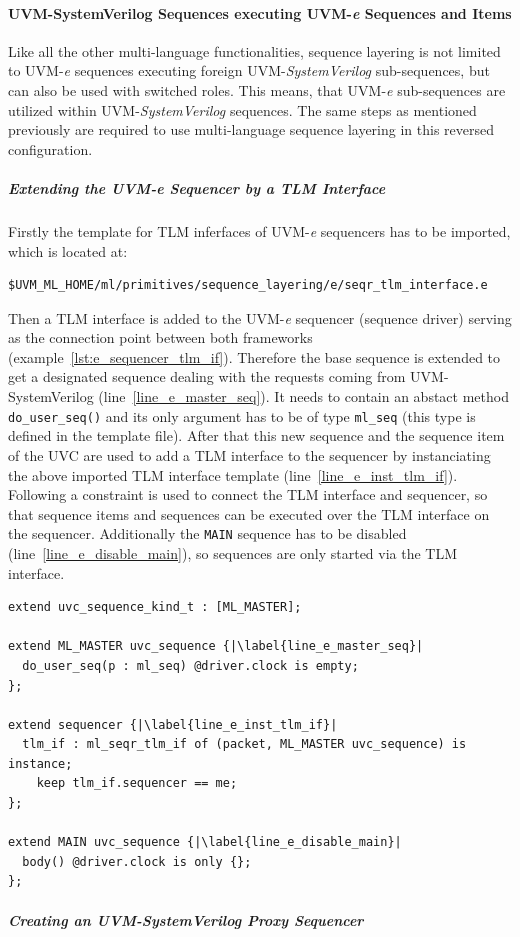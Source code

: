 \paragraph{UVM-SystemVerilog Sequences executing UVM-\textit{e} Sequences and Items}
Like all the other multi-language functionalities, sequence layering is not limited to UVM-\textit{e} sequences executing foreign UVM-\emph{SystemVerilog} sub-sequences, but can also be used with switched roles. This means, that UVM-\textit{e} sub-sequences are utilized within UVM-\emph{SystemVerilog} sequences. The same steps as mentioned previously are required to use multi-language sequence layering in this reversed configuration. 
\subparagraph{Extending the UVM-\textit{e} Sequencer by a TLM Interface}
Firstly the template for TLM inferfaces of UVM-\textit{e} sequencers has to be imported, which is located at:
\smallskip
{}
\begin{lstlisting}
$UVM_ML_HOME/ml/primitives/sequence_layering/e/seqr_tlm_interface.e
\end{lstlisting} 
\smallskip
Then a TLM interface is added to the UVM-\textit{e} sequencer (sequence driver) serving as the connection point between both frameworks (example~\ref{lst:e_sequencer_tlm_if}). Therefore the base sequence is extended to get a designated sequence dealing with the requests coming from UVM-SystemVerilog (line~\ref{line_e_master_seq}). It needs to contain an abstact method \lstinline$do_user_seq()$ and its only argument has to be of type \lstinline$ml_seq$ (this type is defined in the template file).
After that this new sequence and the sequence item of the UVC are used to add a TLM interface to the sequencer by instanciating the above imported TLM interface template (line~\ref{line_e_inst_tlm_if}). Following a constraint is used to connect the TLM interface and sequencer, so that sequence items and sequences can be executed over the TLM interface on the sequencer.
Additionally the \lstinline$MAIN$ sequence has to be disabled (line~\ref{line_e_disable_main}), so sequences are only started via the TLM interface.
\lstset{language=e, numbers = left, escapechar=|, breaklines=true}
\begin{lstlisting}[frame=htrbl, caption={\textit{e}: adding a TLM interface to the UVM-\textit{e} sequencer},
label={lst:e_sequencer_tlm_if}]
extend uvc_sequence_kind_t : [ML_MASTER];

extend ML_MASTER uvc_sequence {|\label{line_e_master_seq}|
  do_user_seq(p : ml_seq) @driver.clock is empty;
};

extend sequencer {|\label{line_e_inst_tlm_if}|
  tlm_if : ml_seqr_tlm_if of (packet, ML_MASTER uvc_sequence) is instance;
    keep tlm_if.sequencer == me;
};

extend MAIN uvc_sequence {|\label{line_e_disable_main}|
  body() @driver.clock is only {};
};
\end{lstlisting}
\subparagraph{Creating an UVM-SystemVerilog Proxy Sequencer}

